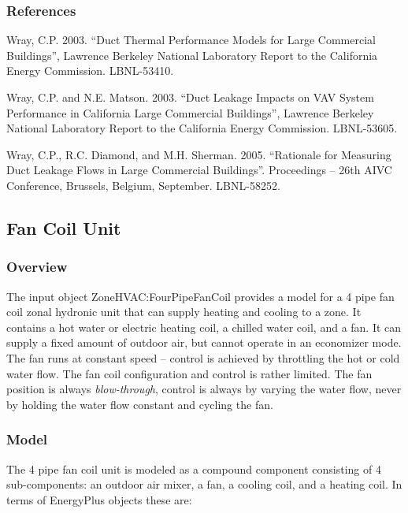 \subsubsection{References}\label{references-3-005}

Wray, C.P. 2003. ``Duct Thermal Performance Models for Large Commercial Buildings'', Lawrence Berkeley National Laboratory Report to the California Energy Commission. LBNL-53410.

Wray, C.P. and N.E. Matson. 2003. ``Duct Leakage Impacts on VAV System Performance in California Large Commercial Buildings'', Lawrence Berkeley National Laboratory Report to the California Energy Commission. LBNL-53605.

Wray, C.P., R.C. Diamond, and M.H. Sherman. 2005. ``Rationale for Measuring Duct Leakage Flows in Large Commercial Buildings''. Proceedings -- 26th AIVC Conference, Brussels, Belgium, September. LBNL-58252.

\subsection{Fan Coil Unit}\label{fan-coil-unit}

\subsubsection{Overview}\label{overview-4-003}

The input object ZoneHVAC:FourPipeFanCoil provides a model for a 4 pipe fan coil zonal hydronic unit that can supply heating and cooling to a zone. It contains a hot water or electric heating coil, a chilled water coil, and a fan. It can supply a fixed amount of outdoor air, but cannot operate in an economizer mode. The fan runs at constant speed -- control is achieved by throttling the hot or cold water flow. The fan coil configuration and control is rather limited. The fan position is always \emph{blow-through}, control is always by varying the water flow, never by holding the water flow constant and cycling the fan.

\subsubsection{Model}\label{model-3-000}

The 4 pipe fan coil unit is modeled as a compound component consisting of 4 sub-components: an outdoor air mixer, a fan, a cooling coil, and a heating coil. In terms of EnergyPlus objects these are:

